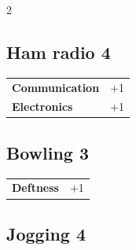 \begin{multicols}{2}
\begin{tcolorbox}
    \subsection*{Ham radio \hfill \small{4 }}
    \tcblower




\begin{tabular}{@{}ll@{}}
    \textbf{Communication} & +1\\
    \textbf{Electronics} & +1\\
\end{tabular}


\end{tcolorbox}

\begin{tcolorbox}
    \subsection*{Bowling \hfill \small{3 }}
    \tcblower




\begin{tabular}{@{}ll@{}}
    \textbf{Deftness} & +1\\
\end{tabular}


\end{tcolorbox}

\begin{tcolorbox}
    \subsection*{Jogging \hfill \small{4 }}
    \tcblower





\end{tcolorbox}
\end{multicols}
